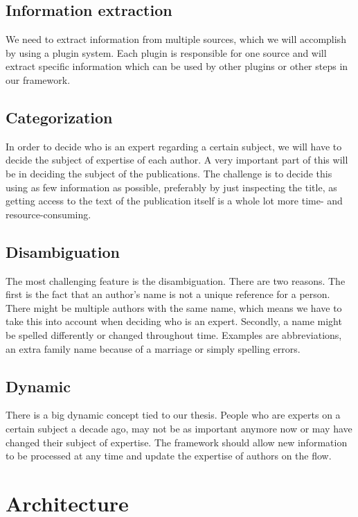 \subsection{Information extraction}

We need to extract information from multiple sources, which we will accomplish by using a plugin system. Each plugin is responsible for one source and will extract specific information which can be used by other plugins or other steps in our framework.

\subsection{Categorization}

In order to decide who is an expert regarding a certain subject, we will have to decide the subject of expertise of each author. A very important part of this will be in deciding the subject of the publications. The challenge is to decide this using as few information as possible, preferably by just inspecting the title, as getting access to the text of the publication itself is a whole lot more time- and resource-consuming.

\subsection{Disambiguation}

The most challenging feature is the disambiguation. There are two reasons. The first is the fact that an author's name is not a unique reference for a person. There might be multiple authors with the same name, which means we have to take this into account when deciding who is an expert. Secondly, a name might be spelled differently or changed throughout time. Examples are abbreviations, an extra family name because of a marriage or simply spelling errors.

\subsection{Dynamic}

There is a big dynamic concept tied to our thesis. People who are experts on a certain subject a decade ago, may not be as important anymore now or may have changed their subject of expertise. The framework should allow new information to be processed at any time and update the expertise of authors on the flow.

\section{Architecture}


